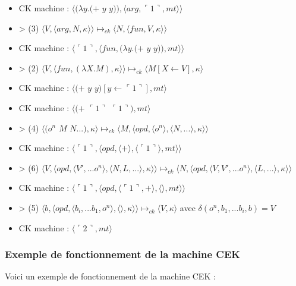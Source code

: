 \documentclass[10pt,a4paper]{article}
\begin{document}
\begin{itemize}
					\item[] CK machine : $\langle(\lambda y.(+$ $y$ $y)),\langle arg,\ulcorner 1\urcorner,mt\rangle\rangle$	
					\item[] > (3) $\langle V,\langle arg,N,\kappa \rangle \rangle \longmapsto_{ck} \langle N,\langle fun,V,\kappa \rangle \rangle$
					\item[] CK machine : $\langle\ulcorner 1\urcorner,\langle fun,(\lambda y.(+$ $y$ $y)),mt\rangle\rangle$	
					\item[] > (2) $\langle V,\langle fun,(\lambda X.M),\kappa \rangle \rangle \longmapsto_{ck} \langle M[X \leftarrow V],\kappa\rangle$	
					\item[] CK machine : $\langle(+$ $y$ $y)[y \leftarrow\ulcorner 1\urcorner],mt\rangle$
					\item[] CK machine : $\langle(+$ $\ulcorner 1\urcorner$ $\ulcorner 1\urcorner),mt\rangle$
					\item[] > (4) $\langle(o^{n}$ $M$ $N...),\kappa\rangle \longmapsto_{ck} \langle M,\langle opd,\langle o^{n}\rangle,\langle N,...\rangle,\kappa\rangle\rangle$
					\item[] CK machine : $\langle\ulcorner 1\urcorner,\langle opd,\langle + \rangle,\langle\ulcorner 1\urcorner\rangle,mt\rangle\rangle$
					\item[] > (6) $\langle V,\langle opd,\langle V',...o^{n}\rangle,\langle N,L,...\rangle,\kappa\rangle\rangle \longmapsto_{ck} \langle N,\langle opd,\langle V,V',...o^{n}\rangle,\langle L,...\rangle,\kappa\rangle\rangle$
					\item[] CK machine : $\langle\ulcorner 1\urcorner,\langle opd,\langle\ulcorner 1\urcorner,+ \rangle,\langle\rangle,mt\rangle\rangle$
					\item[] > (5) $\langle b,\langle opd,\langle b_{i},...b_{1},o^{n}\rangle,\langle\rangle,\kappa\rangle\rangle \longmapsto_{ck} \langle V,\kappa\rangle$ avec $\delta(o^{n},b_{1},...b_{i},b) = V$
					\item[] CK machine : $\langle\ulcorner 2\urcorner,mt\rangle$
				\end{itemize}
				\newpage
				
				
				
			\subsubsection{Exemple de fonctionnement de la machine CEK}\label{CEK}
					
				Voici un exemple de fonctionnement de la machine CEK :
					
\end{document}
